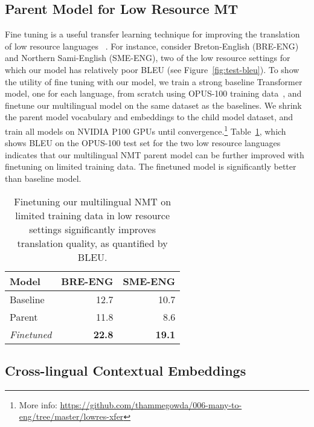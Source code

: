 \subsection{Parent Model for Low Resource MT}
\label{sec:value.transfer-learning}
 Fine tuning is a useful transfer learning technique for improving the translation of low resource languages ~\cite{zoph-etal-2016-transfer,neubig-hu-2018-rapid,gheini2019universal}. 
For instance, consider Breton-English (BRE-ENG) and Northern Sami-English (SME-ENG), two of the low resource settings for which our model has relatively poor BLEU (see Figure~\ref{fig:test-bleu}). 
To show the utility of fine tuning with our model, we train a strong baseline Transformer model, one for each language, from scratch using OPUS-100 training data~\cite{zhang-etal-2020-multiling-nmt}, and finetune our multilingual model on the same dataset as the baselines. We shrink the parent model vocabulary and embeddings to the child model dataset, and train all models on NVIDIA P100 GPUs until convergence.\footnote{More info: \url{https://github.com/thammegowda/006-many-to-eng/tree/master/lowres-xfer}}
 Table~\ref{tab:transfer-lowres}, which shows BLEU on the OPUS-100 test set for the two low resource languages indicates that our multilingual NMT parent model can be further improved with finetuning on limited training data. The finetuned model is significantly better than baseline model.

\begin{table}[ht]
    \centering
    \begin{tabular}{l  r r}
        Model     & BRE-ENG & SME-ENG \\ \hline\hline
        Baseline  & 12.7  &  10.7  \\
        Parent    & 11.8  &  8.6  \\
        \textit{Finetuned} & \textbf{22.8}  & \textbf{19.1}  \\ 
    \end{tabular}
    \caption{Finetuning our multilingual NMT on limited training data in low resource settings significantly improves translation quality, as quantified by BLEU.}
    \label{tab:transfer-lowres}
\end{table}

\subsection{Cross-lingual Contextual Embeddings}

